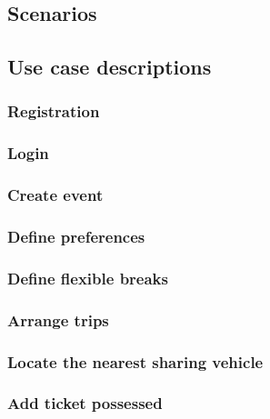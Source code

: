 \subsection{Scenarios}
\subsection{Use case descriptions}
	\subsubsection{Registration}
		
		
	\subsubsection{Login}
		
		
	\subsubsection{Create event}
		
		
	\subsubsection{Define preferences}
		
		
	\subsubsection{Define flexible breaks}
			
		
	\subsubsection{Arrange trips}
			
		
	\subsubsection{Locate the nearest sharing vehicle}
			
		
	\subsubsection{Add ticket possessed}
			
	
